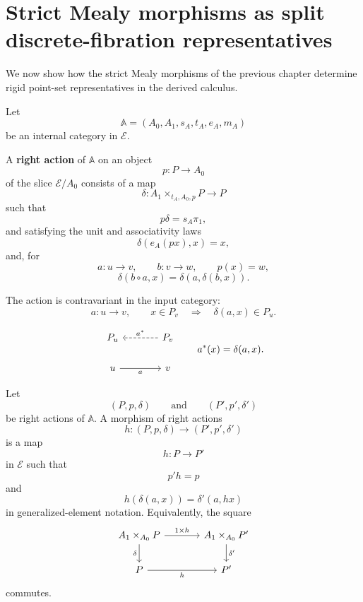 \section{Strict Mealy morphisms as split discrete-fibration representatives}
\label{sec:strict-mealy-as-split-discrete-derived-rewritten}

We now show how the strict Mealy morphisms of the previous chapter
determine rigid point-set representatives in the derived calculus.

Let
\[
\mathbb A=(A_0,A_1,s_A,t_A,e_A,m_A)
\]
be an internal category in \(\mathcal E\).

\begin{definition}
\label{def:right-action-internal-category-rewritten}
A \textbf{right action} of \(\mathbb A\) on an object
\[
p:P\to A_0
\]
of the slice \(\mathcal E/A_0\) consists of a map
\[
\delta:
A_1\times_{t_A,A_0,p}P
\longrightarrow
P
\]
such that
\[
p\delta=s_A\pi_1,
\]
and satisfying the unit and associativity laws
\[
\delta(e_A(px),x)=x,
\]
and, for
\[
a:u\to v,
\qquad
b:v\to w,
\qquad
p(x)=w,
\]
\[
\delta(b\circ a,x)
=
\delta(a,\delta(b,x)).
\]
\end{definition}

The action is contravariant in the input category:
\[
a:u\to v,
\qquad
x\in P_v
\quad\Longrightarrow\quad
\delta(a,x)\in P_u.
\]

\[
\begin{tikzcd}[column sep=large]
P_u
&
P_v
\arrow[l, dashed, "{a^\ast}"']
\\
u
\arrow[r, "a"']
&
v
\end{tikzcd}
\qquad
a^\ast(x)=\delta(a,x).
\]

\begin{definition}
\label{def:morphisms-right-actions}
Let
\[
(P,p,\delta)
\qquad\text{and}\qquad
(P',p',\delta')
\]
be right actions of \(\mathbb A\). A morphism of right actions
\[
h:(P,p,\delta)\to(P',p',\delta')
\]
is a map
\[
h:P\to P'
\]
in \(\mathcal E\) such that
\[
p'h=p
\]
and
\[
h(\delta(a,x))=\delta'(a,hx)
\]
in generalized-element notation. Equivalently, the square
\[
\begin{tikzcd}[column sep=large]
A_1\times_{A_0}P
\arrow[r, "{1\times h}"]
\arrow[d, "\delta"']
&
A_1\times_{A_0}P'
\arrow[d, "\delta'"]
\\
P
\arrow[r, "h"']
&
P'
\end{tikzcd}
\]
commutes.
\end{definition}


